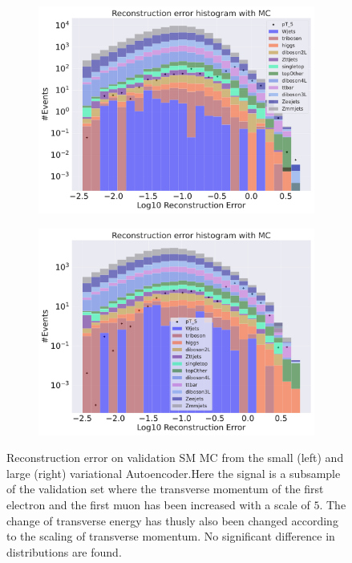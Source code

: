 \begin{figure}[H]
    \centering
    \begin{subfigure}{.45\textwidth}
        \includegraphics[width=\textwidth]{Figures/VAE_testing/small/b_data_recon_big_rm3_feats_sig_pT_5.pdf}
        \caption{}
        \label{fig:VAE_small_pt_5}
    \end{subfigure}
    \hfill 
    \begin{subfigure}{.45\textwidth}
        \includegraphics[width=\textwidth]{Figures/VAE_testing/big/b_data_recon_big_rm3_feats_sig_pT_5.pdf}
        \caption{ }
        \label{fig:VAE_big_pt_5}
    \end{subfigure}
    \hfill 
    \caption[VAE | Reconstruction error $p_T$ altering of 5]{Reconstruction error on validation SM MC from the small (left) and large (right) variational Autoencoder.Here the signal is a subsample of the validation 
    set where the transverse momentum of the first electron and the first muon has been increased with a scale of $5$. The change of transverse 
    energy has thusly also been changed according to the scaling of transverse momentum.  No significant difference in distributions are found.  }
    \label{fig:VAE_big_small_pt_5}
\end{figure}


